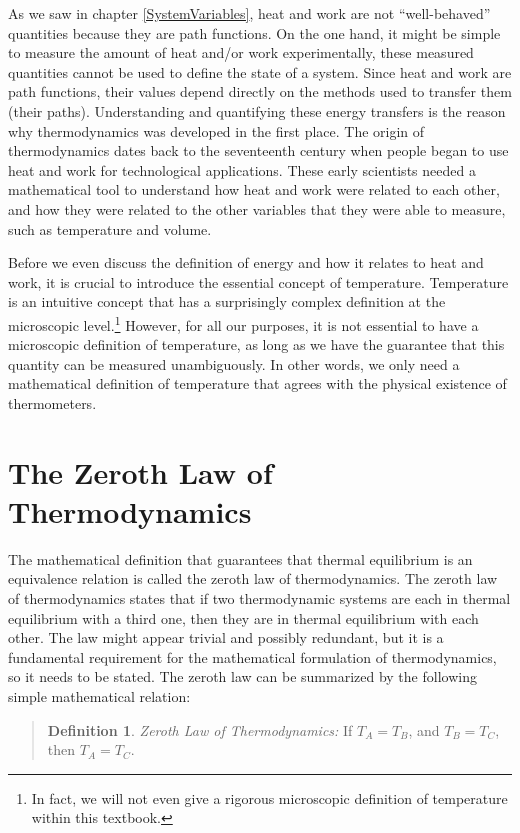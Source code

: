 \documentclass[
  9pt,
]{extbook}
\theoremstyle{definition}
\newtheorem{definition}{Definition}[chapter]
\theoremstyle{definition}
\theoremstyle{definition}
\theoremstyle{definition}
\theoremstyle{remark}
\begin{document}
As we saw in chapter \ref{SystemVariables}, heat and work are not ``well-behaved'' quantities because they are path functions. On the one hand, it might be simple to measure the amount of heat and/or work experimentally, these measured quantities cannot be used to define the state of a system. Since heat and work are path functions, their values depend directly on the methods used to transfer them (their paths). Understanding and quantifying these energy transfers is the reason why thermodynamics was developed in the first place. The origin of thermodynamics dates back to the seventeenth century when people began to use heat and work for technological applications. These early scientists needed a mathematical tool to understand how heat and work were related to each other, and how they were related to the other variables that they were able to measure, such as temperature and volume.

Before we even discuss the definition of energy and how it relates to heat and work, it is crucial to introduce the essential concept of temperature. Temperature is an intuitive concept that has a surprisingly complex definition at the microscopic level.\footnote{In fact, we will not even give a rigorous microscopic definition of temperature within this textbook.} However, for all our purposes, it is not essential to have a microscopic definition of temperature, as long as we have the guarantee that this quantity can be measured unambiguously. In other words, we only need a mathematical definition of temperature that agrees with the physical existence of thermometers.

\section{The Zeroth Law of Thermodynamics}\label{the-zeroth-law-of-thermodynamics}

The mathematical definition that guarantees that thermal equilibrium is an equivalence relation is called the zeroth law of thermodynamics. The zeroth law of thermodynamics states that if two thermodynamic systems are each in thermal equilibrium with a third one, then they are in thermal equilibrium with each other. The law might appear trivial and possibly redundant, but it is a fundamental requirement for the mathematical formulation of thermodynamics, so it needs to be stated. The zeroth law can be summarized by the following simple mathematical relation:

\begin{quote}
\begin{definition}
\protect\hypertarget{def:zerothlaw}{}\label{def:zerothlaw}\emph{Zeroth Law of Thermodynamics:} If \(T_A = T_B\), and \(T_B = T_C\), then \(T_A = T_C\).
\end{definition}
\end{quote}
\end{document}
